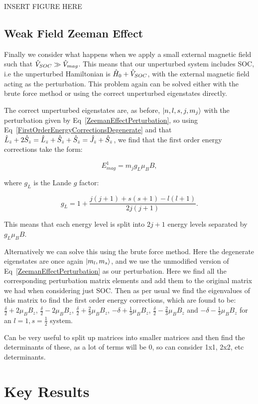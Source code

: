 INSERT FIGURE HERE

\subsection{Weak Field Zeeman Effect}

Finally we consider what happens when we apply a small external magnetic field such that $\Hat{V}_{SOC} \gg \Hat{V}_{mag}$. This means that our unperturbed system includes SOC, i.e the unperturbed Hamiltonian is $\Hat{H}_0 + \Hat{V}_{SOC}$, with the external magnetic field acting as the perturbation. This problem again can be solved either with the brute force method or using the correct unperturbed eigenstates directly.

\noindent The correct unperturbed eigenstates are, as before, $\ket{n, l, s, j, m_j}$ with the perturbation given by Eq~\ref{ZeemanEffectPerturbation}, so using Eq~\ref{FirstOrderEnergyCorrectionsDegenerate} and that $\Hat{L}_z + 2\Hat{S}_z = \Hat{L}_z + \Hat{S}_z + \Hat{S}_z = \Hat{J}_z + \Hat{S}_z$, we find that the first order energy corrections take the form:

\begin{equation}
    E^1_{mag} = m_j g_L \mu_B B,
    \label{WeakFieldEnergyCorrections}
\end{equation}

\noindent where $g_L$ is the Lande $g$ factor:

\begin{equation}
    g_L = 1 + \frac{j (j + 1) + s (s + 1) - l (l + 1)}{2j(j + 1)}
    \label{LandGFactor}.
\end{equation}

\noindent This means that each energy level is split into $2j + 1$ energy levels separated by $g_L \mu_B B$.

\noindent Alternatively we can solve this using the brute force method. Here the degenerate eigenstates are once again $\ket{m_l, m_s}$, and we use the unmodified version of Eq~\ref{ZeemanEffectPerturbation} as our perturbation. Here we find all the corresponding perturbation matrix elements and add them to the original matrix we had when considering just SOC. Then as per usual we find the eigenvalues of this matrix to find the first order energy corrections, which are found to be: $\frac{\delta}{2} + 2\mu_B B_z$, $\frac{\delta}{2} - 2\mu_B B_z$, $\frac{\delta}{2} + \frac{2}{3}\mu_B B_z$, $-\delta + \frac{1}{3}\mu_B B_z$, $\frac{\delta}{2} - \frac{2}{3}\mu_B B_z$ and $-\delta - \frac{1}{3}\mu_B B_z$ for an $l = 1, s = \frac{1}{2}$ system.


\noindent Can be very useful to split up matrices into smaller matrices and then find the determinants of these, as a lot of terms will be 0, so can consider 1x1, 2x2, etc determinants.

\section{Key Results}
